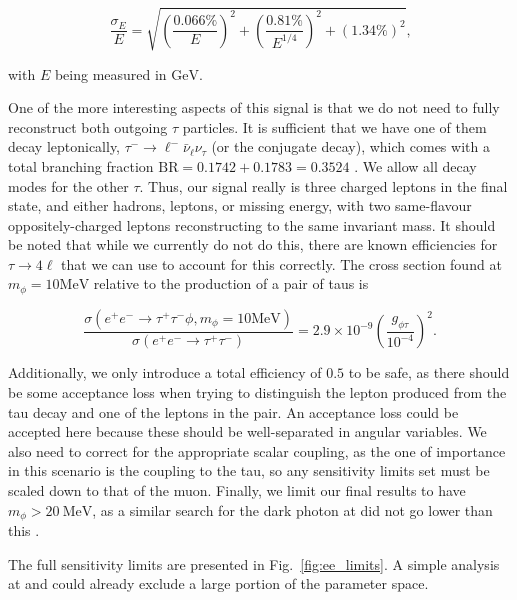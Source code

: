 \begin{equation}
    \frac{\sigma_E}{E} = \sqrt{\left(\frac{0.066\%}{E}\right)^2 + \left(\frac{0.81\%}{E^{1/4}}\right)^2 + \left(1.34\%\right)^2}\textrm{,}
\end{equation}

\noindent with $E$ being measured in $\textrm{GeV}$.

One of the more interesting aspects of this signal is that we do not need to fully reconstruct both outgoing $\tau$ particles.
It is sufficient that we have one of them decay leptonically, $\tau^- \rightarrow \ell^- \bar{\nu}_\ell \nu_\tau$ (or the conjugate decay), which comes with a total branching fraction $\textrm{BR} = 0.1742 + 0.1783 = 0.3524$ \cite{Agashe:2014kda}.
We allow all decay modes for the other $\tau$.
Thus, our signal really is three charged leptons in the final state, and either hadrons, leptons, or missing energy, with two same-flavour oppositely-charged leptons reconstructing to the same invariant mass.
It should be noted that while we currently do not do this, there are known efficiencies for $\tau \rightarrow 4\ell$ that we can use to account for this correctly.
The cross section found at $m_\phi = 10\textrm{MeV}$ relative to the production of a pair of taus is

\begin{equation}
    \frac{\sigma\left(e^+ e^- \rightarrow \tau^+ \tau^- \phi, m_\phi = 10\textrm{MeV}\right)}{\sigma\left(e^+ e^- \rightarrow \tau^+ \tau^-\right)} = 2.9 \times 10^{-9} \left(\frac{g_{\phi\tau}}{10^{-4}}\right)^2\textrm{.}
\end{equation}

\noindent Additionally, we only introduce a total efficiency of $0.5$ to be safe, as there should be some acceptance loss when  trying to distinguish the lepton produced from the tau decay and one of the leptons in the pair.
An acceptance loss could be accepted here because these should be well-separated in angular variables.
We also need to correct for the appropriate scalar coupling, as the one of importance in this scenario is the coupling to the tau, so any sensitivity limits set must be scaled down to that of the muon.
Finally, we limit our final results to have $m_\phi > 20~\textrm{MeV}$, as a similar search for the dark photon at \babar did not go lower than this \cite{Lees:2014xha}.

The full sensitivity limits are presented in Fig.~\ref{fig:ee_limits}.
A simple analysis at \babar and \belle could already exclude a large portion of the parameter space.

